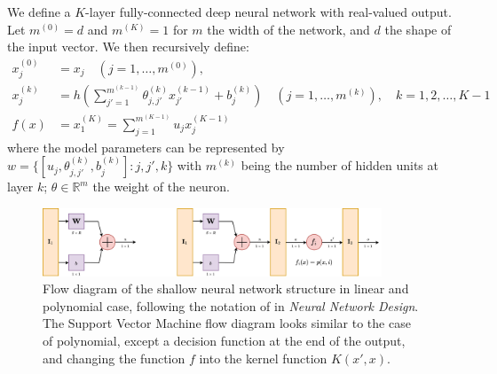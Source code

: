 \documentclass[10pt]{article} %
\begin{document}
\begin{definition}
    We define a $K$-layer fully-connected deep neural network with real-valued output. Let $m^{(0)}=d$ and $m^{(K)}=1$ for $m$ the width of the network, and $d$ the shape of the input vector. We then recursively define: 
\begin{align}
    x_{j}^{(0)} &= x_{j} \quad (j=1,\dots,m^{(0)}),\\ 
    x_{j}^{(k)} &= h\left(\sum^{m^{(k-1)}}_{j'=1} \theta_{j,j'}^{(k)}x_{j'}^{(k-1)}+ b_{j}^{(k)}\right)\quad (j=1,\dots,m^{(k)}), \quad k = 1,2,\dots,K-1\\
    f(x) & = x_{1}^{(K)} = \sum^{m^{(K-1)}}_{j=1} u_{j}x_{j}^{(K-1)}
\end{align}
where the model parameters can be represented by $w=\{[u_{j}, \theta_{j,j'}^{(k)}, b_{j}^{(k)}]: j,j',k\}$ with $m^{(k)}$ being the number of hidden units at layer $k$; $\theta\in \mathbb{R}^{m}$ the weight of the neuron.
\end{definition}

\begin{figure}[htb]
    \centering
    \includegraphics[width=0.9\textwidth]{structure_network_1.png}
    \caption{Flow diagram of the shallow neural network structure in linear and polynomial case, following the notation of \cite{10.5555/2721661} in \textit{Neural Network Design}. The Support Vector Machine flow diagram looks similar to the case of polynomial, except a decision function at the end of the output, and changing the function $f$ into the kernel function $K(x',x)$.}
\end{figure}
\end{document}
